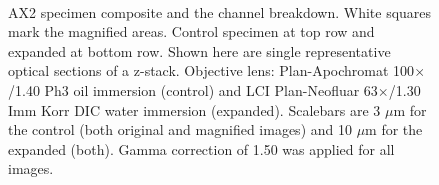 \begin{figure}[h]
\hspace{0.1mm}
\hspace{0.1mm}
\\
\caption{AX2 specimen composite and the channel breakdown. 
White squares mark the magnified areas. 
Control specimen at top row and expanded at bottom row. 
Shown here are single representative optical sections of a z-stack. 
Objective lens: Plan-Apochromat 100$\times$/1.40 Ph3 oil immersion (control) and LCI Plan-Neofluar 63$\times$/1.30 Imm Korr DIC water immersion (expanded). 
Scalebars are 3 $\mu$m for the control (both original and magnified images) and 10 $\mu$m for the expanded (both). 
Gamma correction of 1.50 was applied for all images.} 
\label{fig:axexp}
\end{figure}



\renewcommand{\refname}{\spacedlowsmallcaps{References}} %

%

